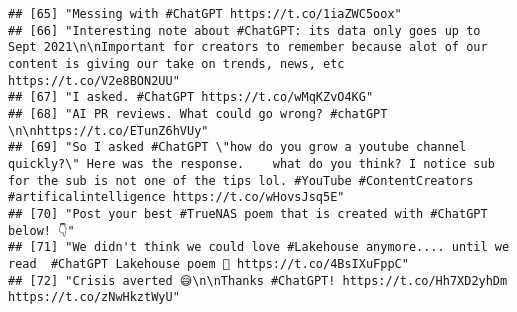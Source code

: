 \documentclass[
]{article}
\begin{document}
\begin{verbatim}
## [65] "Messing with #ChatGPT https://t.co/1iaZWC5oox"                                                                                                                                                                                                                                                                                        
## [66] "Interesting note about #ChatGPT: its data only goes up to Sept 2021\n\nImportant for creators to remember because alot of our content is giving our take on trends, news, etc https://t.co/V2e8BON2UU"                                                                                                                                
## [67] "I asked. #ChatGPT https://t.co/wMqKZvO4KG"                                                                                                                                                                                                                                                                                            
## [68] "AI PR reviews. What could go wrong? #chatGPT \n\nhttps://t.co/ETunZ6hVUy"                                                                                                                                                                                                                                                             
## [69] "So I asked #ChatGPT \"how do you grow a youtube channel quickly?\" Here was the response.    what do you think? I notice sub for the sub is not one of the tips lol. #YouTube #ContentCreators #artificalintelligence https://t.co/wHovsJsq5E"                                                                                        
## [70] "Post your best #TrueNAS poem that is created with #ChatGPT below! 👇"                                                                                                                                                                                                                                                                 
## [71] "We didn't think we could love #Lakehouse anymore.... until we read  #ChatGPT Lakehouse poem 🥺 https://t.co/4BsIXuFppC"                                                                                                                                                                                                               
## [72] "Crisis averted 😅\n\nThanks #ChatGPT! https://t.co/Hh7XD2yhDm https://t.co/zNwHkztWyU"                                                                                                                                                                                                                                                

\end{verbatim}
\end{document}
